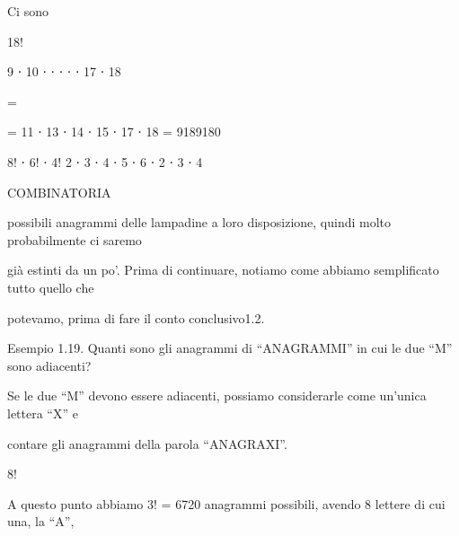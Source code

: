 \documentclass[a4paper,portrait,12pt]{article}
\begin{document}
\begin{flushleft}
Ci sono
\end{flushleft}


18!


9 ⋅ 10 ⋅ ⋅ ⋅ ⋅ ⋅ 17 ⋅ 18


=


= 11 ⋅ 13 ⋅ 14 ⋅ 15 ⋅ 17 ⋅ 18 = 9189180


8! ⋅ 6! ⋅ 4! 2 ⋅ 3 ⋅ 4 ⋅ 5 ⋅ 6 ⋅ 2 ⋅ 3 ⋅ 4










\begin{flushleft}
COMBINATORIA
\end{flushleft}





\begin{flushleft}
possibili anagrammi delle lampadine a loro disposizione, quindi molto probabilmente ci saremo
\end{flushleft}


\begin{flushleft}
gi\`{a} estinti da un po'. Prima di continuare, notiamo come abbiamo semplificato tutto quello che
\end{flushleft}


\begin{flushleft}
potevamo, prima di fare il conto conclusivo1.2.
\end{flushleft}


\begin{flushleft}
Esempio 1.19. Quanti sono gli anagrammi di ``ANAGRAMMI'' in cui le due ``M'' sono adiacenti?
\end{flushleft}


\begin{flushleft}
Se le due ``M'' devono essere adiacenti, possiamo considerarle come un'unica lettera ``X'' e
\end{flushleft}


\begin{flushleft}
contare gli anagrammi della parola ``ANAGRAXI''.
\end{flushleft}


8!


\begin{flushleft}
A questo punto abbiamo 3! = 6720 anagrammi possibili, avendo 8 lettere di cui una, la ``A'',
\end{flushleft}
\end{document}
